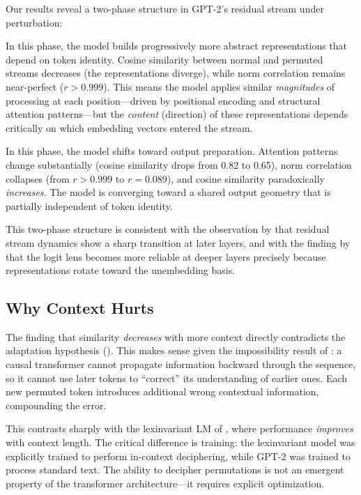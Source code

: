 Our results reveal a two-phase structure in GPT-2's residual stream under perturbation:

In this phase, the model builds progressively more abstract representations that depend on token identity. Cosine similarity between normal and permuted streams decreases (the representations diverge), while norm correlation remains near-perfect ($r > 0.999$). This means the model applies similar \emph{magnitudes} of processing at each position---driven by positional encoding and structural attention patterns---but the \emph{content} (direction) of these representations depends critically on which embedding vectors entered the stream.

In this phase, the model shifts toward output preparation. Attention patterns change substantially (cosine similarity drops from 0.82 to 0.65), norm correlation collapses (from $r > 0.999$ to $r = 0.089$), and cosine similarity paradoxically \emph{increases}. The model is converging toward a shared output geometry that is partially independent of token identity.

This two-phase structure is consistent with the observation by \citet{fernando2025dynamics} that residual stream dynamics show a sharp transition at later layers, and with the finding by \citet{belrose2023tuned} that the logit lens becomes more reliable at deeper layers precisely because representations rotate toward the unembedding basis.

\subsection{Why Context Hurts}

The finding that similarity \emph{decreases} with more context directly contradicts the adaptation hypothesis (). This makes sense given the impossibility result of \citet{alur2025impossibility}: a causal transformer cannot propagate information backward through the sequence, so it cannot use later tokens to ``correct'' its understanding of earlier ones. Each new permuted token introduces additional wrong contextual information, compounding the error.

This contrasts sharply with the lexinvariant LM of \citet{huang2023lexinvariant}, where performance \emph{improves} with context length. The critical difference is training: the lexinvariant model was explicitly trained to perform in-context deciphering, while GPT-2 was trained to process standard text. The ability to decipher permutations is not an emergent property of the transformer architecture---it requires explicit optimization.

